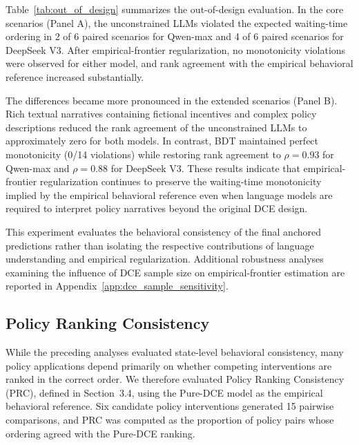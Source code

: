 \documentclass[11pt]{article}
\begin{document}
Table~\ref{tab:out_of_design} summarizes the out-of-design evaluation. In the core scenarios (Panel A), the unconstrained LLMs violated the expected waiting-time ordering in 2 of 6 paired scenarios for Qwen-max and 4 of 6 paired scenarios for DeepSeek V3. After empirical-frontier regularization, no monotonicity violations were observed for either model, and rank agreement with the empirical behavioral reference increased substantially.

The differences became more pronounced in the extended scenarios (Panel B). Rich textual narratives containing fictional incentives and complex policy descriptions reduced the rank agreement of the unconstrained LLMs to approximately zero for both models. In contrast, BDT maintained perfect monotonicity (0/14 violations) while restoring rank agreement to $\rho=0.93$ for Qwen-max and $\rho=0.88$ for DeepSeek V3. These results indicate that empirical-frontier regularization continues to preserve the waiting-time monotonicity implied by the empirical behavioral reference even when language models are required to interpret policy narratives beyond the original DCE design.

This experiment evaluates the behavioral consistency of the final anchored predictions rather than isolating the respective contributions of language understanding and empirical regularization. Additional robustness analyses examining the influence of DCE sample size on empirical-frontier estimation are reported in Appendix~\ref{app:dce_sample_sensitivity}.
\clearpage
\subsection{Policy Ranking Consistency}
\label{sec:policy_ranking}

While the preceding analyses evaluated state-level behavioral consistency, many policy applications depend primarily on whether competing interventions are ranked in the correct order. We therefore evaluated Policy Ranking Consistency (PRC), defined in Section~3.4, using the Pure-DCE model as the empirical behavioral reference. Six candidate policy interventions generated 15 pairwise comparisons, and PRC was computed as the proportion of policy pairs whose ordering agreed with the Pure-DCE ranking.
\end{document}

